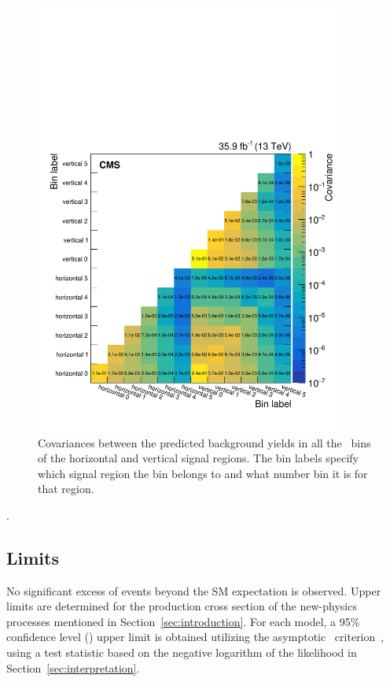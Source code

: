 \begin{figure}[hbtp]
  \centering
  \includegraphics[width=0.9\textwidth]{Analysis/Figures/correlation_matrix.pdf}
  \caption{
    Covariances between the predicted background yields in all the \ETg\ bins of the horizontal and vertical signal regions.
    The bin labels specify which signal region the bin belongs to and what number bin it is for that region.}
  \label{fig:correlation_matrix}
\end{figure}.

\subsection{Limits}
\label{subsec:limits}

No significant excess of events beyond the SM expectation is observed. 
Upper limits are determined for the production cross section of the new-physics processes mentioned in Section~\ref{sec:introduction}. 
For each model, a 95\% confidence level (\CL) upper limit is obtained utilizing the asymptotic \CLs\ criterion~\cite{Junk:1999kv,Read:2002hq,Cowan:2010js}, using a test statistic based on the negative logarithm of the likelihood in Section~\ref{sec:interpretation}.

